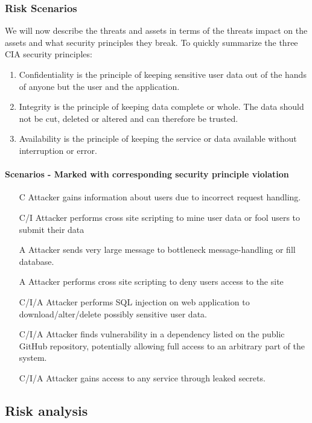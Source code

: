 \subsubsection{Risk Scenarios}
We will now describe the threats and assets in terms of the threats impact on the assets and what security principles they break. 
To quickly summarize the three CIA security principles:
\begin{enumerate}
    \item Confidentiality is the principle of keeping sensitive user data out of the hands of anyone but the user and the application.
    \item Integrity is the principle of keeping data complete or whole. The data should not be cut, deleted or altered and can therefore be trusted.
    \item Availability is the principle of keeping the service or data available without interruption or error.
\end{enumerate}
\paragraph{Scenarios - Marked with corresponding security principle violation}
\begin{enumerate}
    \item [C] Attacker gains information about users due to incorrect request handling.
    \item [C/I] Attacker performs cross site scripting to mine user data or fool users to submit their data 
    \item [A] Attacker sends very large message to bottleneck message-handling or fill database.
    \item [A] Attacker performs cross site scripting to deny users access to the site 
    \item [C/I/A] Attacker performs SQL injection on web application to download/alter/delete possibly sensitive user data.
    \item [C/I/A] Attacker finds vulnerability in a dependency listed on the public GitHub repository, potentially allowing full access to an arbitrary part of the system.
    \item [C/I/A] Attacker gains access to any service through leaked secrets.
\end{enumerate}

\subsection{Risk analysis}
